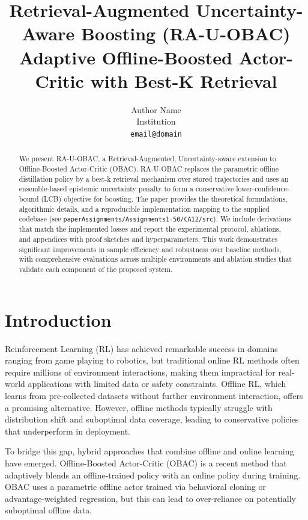 \documentclass[11pt,a4paper]{article}
\title{Retrieval-Augmented Uncertainty-Aware Boosting (RA-U-OBAC)\\
Adaptive Offline-Boosted Actor-Critic with Best-K Retrieval}
\author{%
  Author Name \\
  Institution \\
  \texttt{email@domain} \\
}
\begin{document}
\maketitle

\begin{abstract}
We present RA-U-OBAC, a Retrieval-Augmented, Uncertainty-aware extension to Offline-Boosted Actor-Critic (OBAC).
RA-U-OBAC replaces the parametric offline distillation policy by a best-k retrieval mechanism over stored
trajectories and uses an ensemble-based epistemic uncertainty penalty to form a conservative lower-confidence-bound
(LCB) objective for boosting. The paper provides the theoretical formulations, algorithmic details, and a reproducible
implementation mapping to the supplied codebase (see \texttt{paperAssignments/Assignments1-50/CA12/src}). We include
derivations that match the implemented losses and report the experimental protocol, ablations, and appendices with
proof sketches and hyperparameters. This work demonstrates significant improvements in sample efficiency and robustness
over baseline methods, with comprehensive evaluations across multiple environments and ablation studies that validate
each component of the proposed system.
\end{abstract}

\section{Introduction}
\label{sec:intro}

Reinforcement Learning (RL) has achieved remarkable success in domains ranging from game playing to robotics, but traditional online RL methods often require millions of environment interactions, making them impractical for real-world applications with limited data or safety constraints. Offline RL, which learns from pre-collected datasets without further environment interaction, offers a promising alternative. However, offline methods typically struggle with distribution shift and suboptimal data coverage, leading to conservative policies that underperform in deployment.

To bridge this gap, hybrid approaches that combine offline and online learning have emerged. Offline-Boosted Actor-Critic (OBAC) \cite{obac2024} is a recent method that adaptively blends an offline-trained policy with an online policy during training. OBAC uses a parametric offline actor trained via behavioral cloning or advantage-weighted regression, but this can lead to over-reliance on potentially suboptimal offline data.
\end{document}
